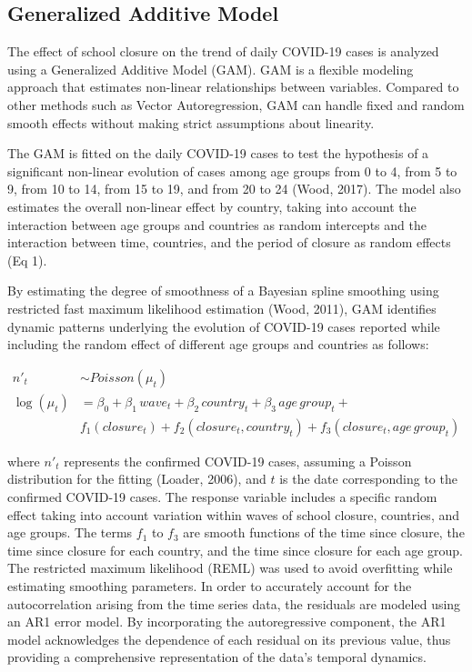 \documentclass[unnumsec,webpdf,contemporary,large]{oup-authoring-template}%
\theoremstyle{thmstyleone}%
\theoremstyle{thmstyletwo}%
\theoremstyle{thmstylethree}%
\begin{document}
\hypertarget{generalized-additive-model}{%
\subsection{Generalized Additive Model}\label{generalized-additive-model}}

The effect of school closure on the trend of daily COVID-19 cases is analyzed using a Generalized Additive Model (GAM). GAM is a flexible modeling approach that estimates non-linear relationships between variables. Compared to other methods such as Vector Autoregression, GAM can handle fixed and random smooth effects without making strict assumptions about linearity.

The GAM is fitted on the daily COVID-19 cases to test the hypothesis of a significant non-linear evolution of cases among age groups from 0 to 4, from 5 to 9, from 10 to 14, from 15 to 19, and from 20 to 24 (Wood, 2017). The model also estimates the overall non-linear effect by country, taking into account the interaction between age groups and countries as random intercepts and the interaction between time, countries, and the period of closure as random effects (Eq 1).

By estimating the degree of smoothness of a Bayesian spline smoothing using restricted fast maximum likelihood estimation (Wood, 2011), GAM identifies dynamic patterns underlying the evolution of COVID-19 cases reported while including the random effect of different age groups and countries as follows:

\begin{align*}
  \tag{1}
  n\prime_t &\sim Poisson(\mu_t) \\
  \log(\mu_t) &= \beta_0 + \beta_1\,wave_t + \beta_2\,country_t + \beta_3\,age\,group_t + \\
              & f_1(closure_t) + f_2(closure_t,country_t) + f_3(closure_t,age\,group_t)
\end{align*}

\noindent where \(n\prime_t\) represents the confirmed COVID-19 cases, assuming a Poisson distribution for the fitting (Loader, 2006), and \(t\) is the date corresponding to the confirmed COVID-19 cases. The response variable includes a specific random effect taking into account variation within waves of school closure, countries, and age groups. The terms \(f_1\) to \(f_3\) are smooth functions of the time since closure, the time since closure for each country, and the time since closure for each age group. The restricted maximum likelihood (REML) was used to avoid overfitting while estimating smoothing parameters. In order to accurately account for the autocorrelation arising from the time series data, the residuals are modeled using an AR1 error model. By incorporating the autoregressive component, the AR1 model acknowledges the dependence of each residual on its previous value, thus providing a comprehensive representation of the data's temporal dynamics.
\end{document}
